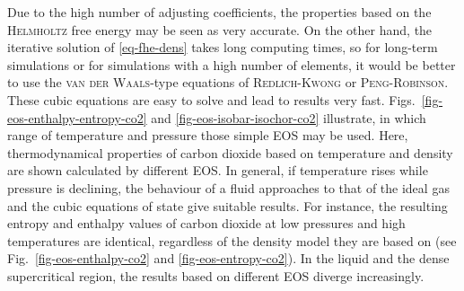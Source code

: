 Due to the high number of adjusting coefficients, the properties based on the \textsc{Helmholtz} free energy may be seen as very 
accurate. On the other hand, the iterative solution of \eqref{eq-fhe-dens} takes long computing times, so for long-term simulations or for simulations with a high number of elements, it would be better to use the \textsc{van der Waals}-type equations of \textsc{Redlich-Kwong} or \textsc{Peng-Robinson}. These cubic equations are easy to solve and lead to results very fast. Figs.~\ref{fig-eos-enthalpy-entropy-co2} and \ref{fig-eos-isobar-isochor-co2} illustrate, in which range of temperature and pressure those simple EOS may be used. Here, thermodynamical properties of carbon dioxide based on temperature and density are shown calculated by different EOS. In general, if temperature rises while pressure is declining, the behaviour of a fluid approaches to that of the ideal gas and the cubic equations of state give suitable results. For instance, the resulting entropy and enthalpy values of carbon dioxide at low pressures and high temperatures are identical, regardless of the density model they are based on (see Fig.~\ref{fig-eos-enthalpy-co2} and \ref{fig-eos-entropy-co2}). In the liquid and the dense supercritical region, the results based on different EOS diverge increasingly.




